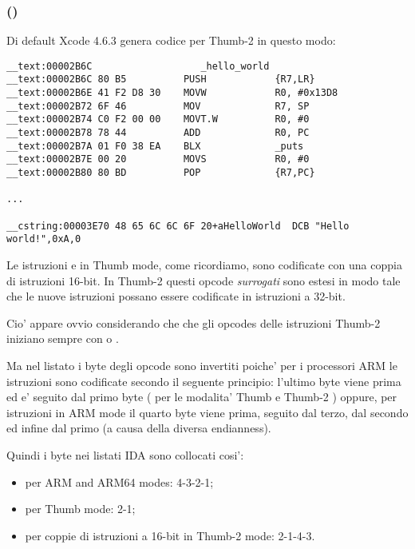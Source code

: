 \subsubsection{\OptimizingXcodeIV (\ThumbTwoMode)}

Di default Xcode 4.6.3 genera codice per Thumb-2 in questo modo:

\begin{lstlisting}[caption=\OptimizingXcodeIV (\ThumbTwoMode),style=customasmARM]
__text:00002B6C                   _hello_world
__text:00002B6C 80 B5          PUSH            {R7,LR}
__text:00002B6E 41 F2 D8 30    MOVW            R0, #0x13D8
__text:00002B72 6F 46          MOV             R7, SP
__text:00002B74 C0 F2 00 00    MOVT.W          R0, #0
__text:00002B78 78 44          ADD             R0, PC
__text:00002B7A 01 F0 38 EA    BLX             _puts
__text:00002B7E 00 20          MOVS            R0, #0
__text:00002B80 80 BD          POP             {R7,PC}

...

__cstring:00003E70 48 65 6C 6C 6F 20+aHelloWorld  DCB "Hello world!",0xA,0
\end{lstlisting}


\myindex{\ThumbTwoMode}

Le istruzioni  e  in Thumb mode, come ricordiamo, sono codificate con una coppia di istruzioni 16-bit.
In Thumb-2 questi opcode \emph{surrogati} sono estesi in modo tale che le nuove istruzioni possano essere codificate in istruzioni a 32-bit.

Cio' appare ovvio considerando che che gli opcodes delle istruzioni Thumb-2 iniziano sempre con  o .

Ma nel listato \IDA 
i byte degli opcode sono invertiti poiche' per i processori ARM le istruzioni sono codificate secondo il seguente principio: 
l'ultimo byte viene prima ed e' seguito dal primo byte ( per le modalita' Thumb e Thumb-2 ) 
oppure, per istruzioni in ARM mode il quarto byte viene prima, seguito dal terzo, dal secondo ed infine dal primo (a causa
della diversa \gls{endianness}).

Quindi i byte nei listati IDA sono collocati cosi':
\begin{itemize}
\item per ARM and ARM64 modes: 4-3-2-1;
\item per Thumb mode: 2-1;
\item per coppie di istruzioni a 16-bit in Thumb-2 mode: 2-1-4-3.
\end{itemize}

